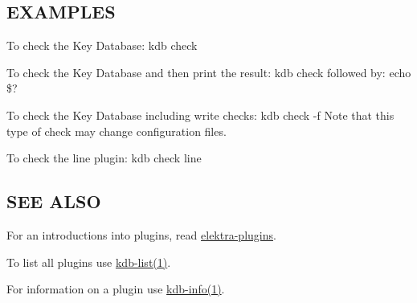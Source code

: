 \subsection*{E\+X\+A\+M\+P\+L\+ES}

To check the Key Database\+: {\ttfamily kdb check}

To check the Key Database and then print the result\+: {\ttfamily kdb check} followed by\+: {\ttfamily echo \$?}

To check the Key Database including write checks\+: {\ttfamily kdb check -\/f} Note that this type of check may change configuration files.

To check the {\ttfamily line} plugin\+: {\ttfamily kdb check line}

\subsection*{S\+EE A\+L\+SO}


\begin{DoxyItemize}
\item For an introductions into plugins, read \hyperlink{md_src_plugins_README_src_plugins_README_md}{elektra-\/plugins}.
\item To list all plugins use \hyperlink{md_doc_help_kdb-list_doc_help_kdb-list_md}{kdb-\/list(1)}.
\item For information on a plugin use \hyperlink{md_doc_help_kdb-info_doc_help_kdb-info_md}{kdb-\/info(1)}. 
\end{DoxyItemize}